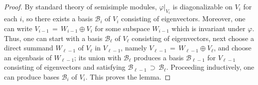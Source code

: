 \documentclass[10pt,a4paper]{amsart}
\newcommand{\mc}[1]{\mathcal{#1}}
\begin{document}
	\begin{proof}
		By standard theory of semisimple modules,  $\varphi|_{V_i}$ is diagonalizable on $V_i$ for each $i$, so
		there exists a basis $\mc{B}_{i}$ of $V_{i}$ consisting of eigenvectors. Moreover, one can write
		$V_{i-1}\,=\,W_{i-1}\oplus V_{i}$ for some subspace $W_{i-1}$ which is invariant under $\varphi$. Thus,
		one can start with a basis $\mc{B}_{\ell}$ of $V_{\ell}$ consisting of eigenvectors, next choose a direct
		summand $W_{\ell-1}$ of $V_{\ell}$ in $V_{\ell-1}$, namely $V_{\ell-1} \,=\, W_{\ell-1}\oplus V_{\ell}$, and choose an
		eigenbasis of $W_{\ell-1}$;  its union with $\mc{B}_{\ell}$ produces a basis $\mc{B}_{\ell-1}$ for $V_{\ell-1}$
		consisting of eigenvectors and satisfying $\mc{B}_{\ell-1}\,\supset\,\mc{B}_{\ell}$. Proceeding inductively, one
		can produce bases $\mc{B}_i$ of $V_i$. This proves the lemma.
	\end{proof}
\end{document}
